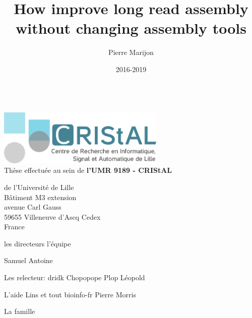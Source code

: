 \documentclass{thesis}
\title{How improve long read assembly without changing assembly tools} %
\author{Pierre Marijon}
\date{2016-2019}
\newcommand{\onlyinsubfile}[1]{#1}
\newcommand{\notinsubfile}[1]{}
\begin{document}
\renewcommand{\onlyinsubfile}[1]{}
\renewcommand{\notinsubfile}[1]{#1}

\maketitle
\clearpage

\listoftodos

\begin{center}
~\vspace*{\fill}\\
\thispagestyle{plain}
\includegraphics[width=0.6\textwidth]{assets/images/logo_cristal}\vspace{0.5cm}\\
Thèse effectuée au sein de \textbf{l'UMR 9189 - CRIStAL}\par 
 de l'Université de Lille\\
Bâtiment M3 extension\\
avenue Carl Gauss\\
59655 Villeneuve d'Ascq Cedex\\
France
\vspace*{\fill}
\clearpage
\end{center}

\frontmatter




les directeurs
l'équipe

Samuel
Antoine

Les relecteur:
dridk
Chopopope
Plop
Léopold

L'aide 
Lins et tout bioinfo-fr
Pierre Morris

La famille

\tableofcontents

\mainmatter












\notinsubfile{


}
\end{document}

